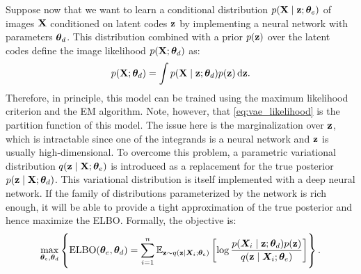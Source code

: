 Suppose now that we want to learn a conditional distribution $p({\mathbf{X}} \mid {\mathbf{z}}; {\bm{\theta}}_e)$ of images ${\mathbf{X}}$ conditioned on latent codes ${\mathbf{z}}$ by implementing a neural network with parameters ${\bm{\theta}}_d$. This distribution combined with a prior $p({\mathbf{z}})$ over the latent codes define the image likelihood $p({\mathbf{X}}; {\bm{\theta}}_d)$ as:
\begin{equation}
    \label{eq:vae_likelihood}
    p({\mathbf{X}}; {\bm{\theta}}_d) = \int p({\mathbf{X}} \mid {\mathbf{z}}; {\bm{\theta}}_d) p({\mathbf{z}}) {\,\text{d}} {\mathbf{z}}.
\end{equation}
Therefore, in principle, this model can be trained using the maximum likelihood criterion and the EM algorithm. Note, however, that \eqref{eq:vae_likelihood} is the partition function of this model. The issue here is the marginalization over ${\mathbf{z}}$, which is intractable since one of the integrands is a neural network and ${\mathbf{z}}$ is usually high-dimensional. To overcome this problem, a parametric variational distribution $q({\mathbf{z}} \mid {\mathbf{X}}; {\bm{\theta}}_e)$ is introduced as a replacement for the true posterior $p({\mathbf{z}} \mid {\mathbf{X}}; {\bm{\theta}}_d)$. This variational distribution is itself implemented with a deep neural network. If the family of distributions parameterized by the network is rich enough, it will be able to provide a tight approximation of the true posterior and hence maximize the ELBO. Formally, the objective is:
\begin{equation}
    \max_{{\bm{\theta}}_e, {\bm{\theta}}_d} \left\lbrace \mathrm{ELBO}({\bm{\theta}}_e, {\bm{\theta}}_d) = \sum_{i=1}^n \mathbb{E}_{{\mathbf{z}} \sim q({\mathbf{z}} \mid {\bm{X}}_i; {\bm{\theta}}_e)} \left[ \log \frac{p({\bm{X}}_i \mid {\mathbf{z}}; {\bm{\theta}}_d)p({\mathbf{z}})}{q({\mathbf{z}} \mid {\bm{X}}_i; {\bm{\theta}}_e)} \right] \right\rbrace.
\end{equation}


